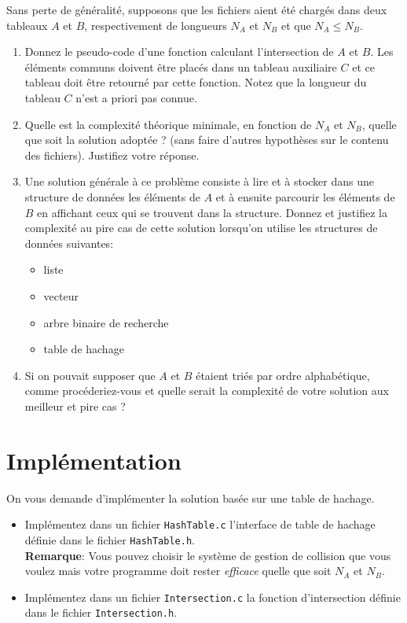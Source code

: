 \documentclass[a4paper,10pt]{article}
\begin{document}
Sans perte de généralité, supposons que les fichiers aient été chargés
dans deux tableaux $A$ et $B$, respectivement de longueurs $N_A$ et $N_B$ et que
$N_A\leq N_B$.
\begin{enumerate}
\item Donnez le pseudo-code d'une fonction calculant l'intersection de $A$ et $B$.
  Les éléments communs doivent être placés dans un tableau auxiliaire $C$ et
  ce tableau doit être retourné par cette fonction. Notez que la longueur du tableau $C$ n'est a priori pas connue.
\item Quelle est la complexité théorique minimale, en fonction de $N_A$ et $N_B$, quelle que soit la
  solution adoptée ? (sans faire d'autres hypothèses sur le contenu
  des fichiers). Justifiez votre réponse.
\item Une solution générale à ce problème consiste à lire et à stocker
  dans une structure de données les éléments de $A$ et à
  ensuite parcourir les éléments de $B$ en affichant ceux qui
  se trouvent dans la structure. Donnez et justifiez la complexité au pire cas de cette solution
  lorsqu'on utilise les structures de données suivantes:
\begin{itemize}
\item liste
\item vecteur
\item arbre binaire de recherche
\item table de hachage
\end{itemize}
\item Si on pouvait supposer que $A$ et $B$ étaient
  triés par ordre alphabétique, comme procéderiez-vous et quelle
  serait la complexité de votre solution aux meilleur et pire cas ?
\end{enumerate}

\section{Implémentation}

On vous demande d'implémenter la solution basée sur une table de
hachage.

\begin{itemize}
\item Implémentez dans un fichier \texttt{HashTable.c} l'interface de table de hachage définie dans le fichier \texttt{HashTable.h}.\\
  \textbf{Remarque}: Vous pouvez choisir le système de gestion de collision
  que vous voulez mais votre programme doit rester {\it efficace} quelle
  que soit $N_A$ et $N_B$.
\item Implémentez dans un fichier \texttt{Intersection.c} la fonction d'intersection définie dans le fichier \texttt{Intersection.h}.
\end{itemize}
\end{document}
